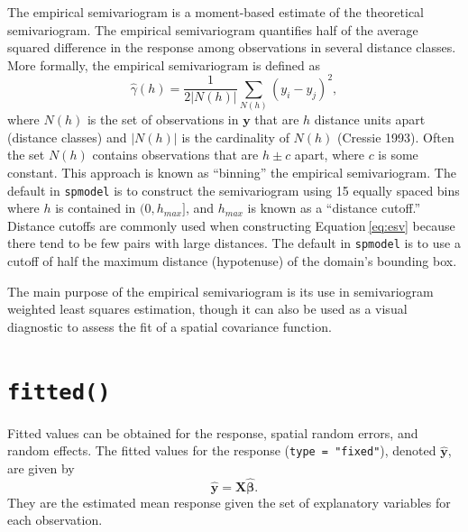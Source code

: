 \documentclass{article}
\begin{document}
The empirical semivariogram is a moment-based estimate of the
theoretical semivariogram. The empirical semivariogram quantifies half
of the average squared difference in the response among observations in
several distance classes. More formally, the empirical semivariogram is
defined as \begin{equation}\label{eq:esv}
  \hat{\gamma}(h) = \frac{1}{2|N(h)|} \sum_{N(h)} (y_i - y_j)^2, 
\end{equation} where \(N(h)\) is the set of observations in
\(\mathbf{y}\) that are \(h\) distance units apart (distance classes)
and \(|N(h)|\) is the cardinality of \(N(h)\) (Cressie 1993). Often the
set \(N(h)\) contains observations that are \(h \pm c\) apart, where
\(c\) is some constant. This approach is known as ``binning'' the
empirical semivariogram. The default in \texttt{spmodel} is to construct
the semivariogram using 15 equally spaced bins where \(h\) is contained
in \((0, h_{max}]\), and \(h_{max}\) is known as a ``distance cutoff.''
Distance cutoffs are commonly used when constructing
Equation\(~\)\ref{eq:esv} because there tend to be few pairs with large
distances. The default in \texttt{spmodel} is to use a cutoff of half
the maximum distance (hypotenuse) of the domain's bounding box.

The main purpose of the empirical semivariogram is its use in
semivariogram weighted least squares estimation, though it can also be
used as a visual diagnostic to assess the fit of a spatial covariance
function.

\hypertarget{sec:fitted}{%
\section{\texorpdfstring{\texttt{fitted()}}{fitted()}}\label{sec:fitted}}

Fitted values can be obtained for the response, spatial random errors,
and random effects. The fitted values for the response
(\texttt{type\ =\ "fixed"}), denoted \(\mathbf{\hat{y}}\), are given by
\begin{equation*}\label{eq:fit_resp}
  \mathbf{\hat{y}} = \mathbf{X} \boldsymbol{\hat{\beta}} .
\end{equation*} They are the estimated mean response given the set of
explanatory variables for each observation.
\end{document}
